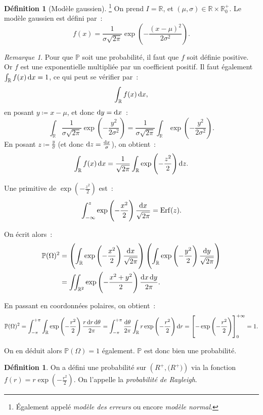 \documentclass{article}
\renewcommand{\P}{\mathbb P}
\newcommand{\R}{\mathbb R}
\DeclareMathOperator{\Erf}{Erf}
\theoremstyle{definition}
\newtheorem{déf}[thm]{Définition}
\theoremstyle{remark}
\newtheorem*{rmq}{Remarque}
\begin{document}
		\begin{déf}[Modèle gaussien]\footnote{Également appelé \textit{modèle des erreurs} ou encore \textit{modèle normal}.} On prend $I = \R$, et
		$(\mu, \sigma) \in \R \times \R^+_0$. Le modèle gaussien est défini par~:
		\[f(x) = \frac 1{\sigma\sqrt{2\pi}}\exp\left(-\frac {(x-\mu)^2}{2\sigma^2}\right).\]
		\end{déf}

		\begin{rmq} Pour que $\P$ soit une probabilité, il faut que $f$ soit définie positive. Or $f$ est une exponentielle multipliée par un coefficient
		positif. Il faut également $\int_\R f(x)\dif x = 1$, ce qui peut se vérifier par~:
		\[\int_\R f(x)\dif x,\]
		en posant $y \coloneqq x-\mu$, et donc $\dif y = \dif x$~:
		\[\int_\R \frac 1{\sigma \sqrt{2\pi}}\exp\left(-\frac {y^2}{2\sigma^2}\right) = \frac 1{\sigma\sqrt{2\pi}}\int_\R\exp\left(-\frac {y^2}{2\sigma^2}\right).\]
		En posant $z \coloneqq \frac y\sigma$ (et donc $\dif z = \frac {\dif x}\sigma$), on obtient~:
		\[\int_\R f(x)\dif x = \frac 1{\sqrt{2\pi}}\int_\R\exp\left(-\frac {z^2}2\right)\dif z.\]

		Une primitive de $\exp\left(-\frac {z^2}2\right)$ est~:
		\[\int_{-\infty}^z\exp\left(-\frac {x^2}2\right)\frac {\dif x}{\sqrt{2\pi}} = \Erf(z).\]

		On écrit alors~:
		\[\begin{aligned}
			\P(\Omega)^2 &= \left(\int_\R\exp\left(-\frac {x^2}2\right)\frac {\dif x}{\sqrt{2\pi}}\right)
			                \left(\int_\R\exp\left(-\frac {y^2}2\right)\frac {\dif y}{\sqrt{2\pi}}\right) \\
			             &= \iint_{\R^2}\exp\left(-\frac {x^2+y^2}2\right)\frac {\dif x\dif y}{2\pi}.
		\end{aligned}\]
		
		En passant en coordonnées polaires, on obtient~:
		\[\P(\Omega)^2 = \int_{-\pi}^{+\pi}\int_\R\exp\left(-\frac {r^2}2\right)\frac {r\dif r\dif \theta}{2\pi}
		= \int_{-\pi}^{+\pi}\frac {\dif \theta}{2\pi}\int_\R r\exp\left(-\frac {r^2}2\right)\dif r
		= \left[-\exp\left(-\frac {r^2}2\right)\right]_0^{+\infty} = 1.\]

		On en déduit alors $\P(\Omega) = 1$ également. $\P$ est donc bien une probabilité. \end{rmq}
		
		\begin{déf} On a défini une probabilité sur $\left(R^+, \mathcal(R^+)\right)$ via la fonction $f(r) = r\exp\left(-\frac {r^2}2\right)$.
		On l'appelle la \textit{probabilité de Rayleigh}. \end{déf}
\end{document}
